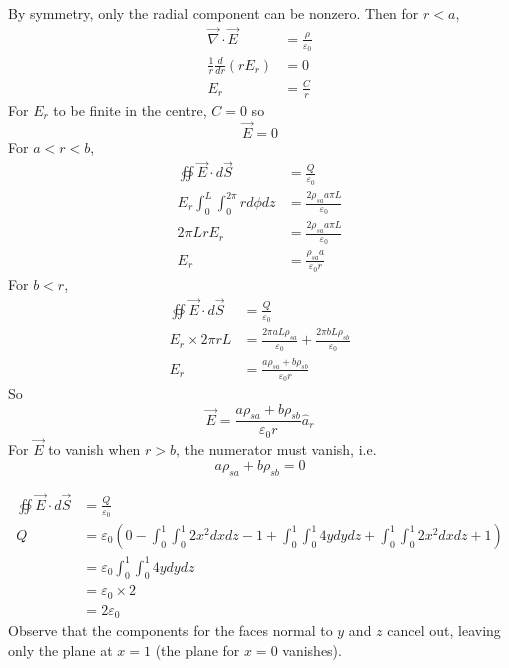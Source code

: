 \documentclass[answers]{exam}
\begin{document}
\begin{questions}
\begin{solution}
	By symmetry, only the radial component can be nonzero. Then for $r<a$,
	\begin{align*}
		\vec{\nabla}\cdot\vec{E} &= \frac{\rho}{\varepsilon_0} \\
		\frac{1}{r}\frac{d}{dr}(rE_r) &= 0 \\
		E_r &= \frac{C}{r}
	\end{align*}
	For $E_r$ to be finite in the centre, $C=0$ so
	$$\vec{E} = 0$$
	For $a<r<b$,
	\begin{align*}
		\oiint \vec{E}\cdot d\vec{S} &= \frac{Q}{\varepsilon_0} \\
		E_r\int_0^L \int_0^{2\pi} rd\phi dz &= \frac{2\rho_{sa}a\pi L}{\varepsilon_0} \\
		2\pi LrE_r &= \frac{2\rho_{sa}a\pi L}{\varepsilon_0} \\
		E_r &= \frac{\rho_{sa}a}{\varepsilon_0r}
	\end{align*}
	For $b<r$,
	\begin{align*}
		\oiint\vec{E}\cdot d\vec{S} &= \frac{Q}{\varepsilon_0} \\
		E_r\times2\pi rL &= \frac{2\pi aL\rho_{sa}}{\varepsilon_0} + \frac{2\pi bL\rho_{sb}}{\varepsilon_0} \\
		E_r &= \frac{a\rho_{sa} + b\rho_{sb}}{\varepsilon_0r}
	\end{align*}
	So
	$$\vec{E} = \frac{a\rho_{sa} + b\rho_{sb}}{\varepsilon_0r}\hat{a}_r$$
	For $\vec{E}$ to vanish when $r>b$, the numerator must vanish, i.e.
	$$a\rho_{sa} + b\rho_{sb} = 0$$
\end{solution}


\begin{solution}
	\begin{align*}
		\oiint \vec{E}\cdot d\vec{S} &= \frac{Q}{\varepsilon_0} \\
		Q &= \varepsilon_0\left(0 - \int_0^1\int_0^1 2x^2 dxdz - 1 + \int_0^1\int_0^1 4ydydz + \int_0^1\int_0^1 2x^2 dxdz + 1\right) \\
		  &= \varepsilon_0\int_0^1\int_0^1 4ydydz \\
		  &= \varepsilon_0\times2 \\
		  &= 2\varepsilon_0
	\end{align*}
	Observe that the components for the faces normal to $y$ and $z$ cancel out, leaving only the plane at $x=1$ (the plane for $x=0$ vanishes).
\end{solution}

\end{questions}
\end{document}
